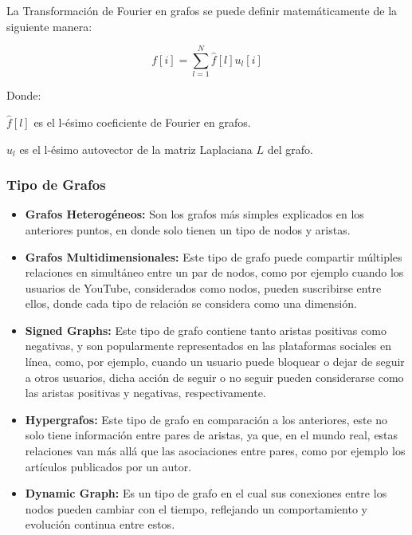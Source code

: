 La Transformación de Fourier en grafos se puede definir matemáticamente de la siguiente manera: 


\begin{equation}
	f[i] = \sum_{l=1}^{N}\hat{f}[l]u_{l}[i]
\end{equation}

Donde: 

$\hat{f}[l]$ es el l-ésimo coeficiente de Fourier en grafos.

$u_{l}$ es el l-ésimo autovector de la matriz Laplaciana $L$ del grafo.

\subsubsection{Tipo de Grafos \parencite{bk_grafo}}

\begin{itemize}
	\item \textbf{Grafos Heterogéneos:} Son los grafos más simples explicados en los anteriores puntos, en donde solo tienen un tipo de nodos y aristas.
	
	\item \textbf{Grafos Multidimensionales:} Este tipo de grafo puede compartir múltiples relaciones en simultáneo entre un par de nodos, como por ejemplo cuando los usuarios de YouTube, considerados como nodos, pueden suscribirse entre ellos, donde cada tipo de relación se considera como una dimensión.
	
	\item \textbf{Signed Graphs:} Este tipo de grafo contiene tanto aristas positivas como negativas, y son popularmente representados en las plataformas sociales en línea, como, por ejemplo, cuando un usuario puede bloquear o dejar de seguir a otros usuarios, dicha acción de seguir o no seguir pueden considerarse como las aristas positivas y negativas, respectivamente.
	
	\item \textbf{Hypergrafos:} Este tipo de grafo en comparación a los anteriores, este no solo tiene información entre pares de aristas, ya que, en el mundo real, estas relaciones van más allá que las asociaciones entre pares, como por ejemplo los artículos publicados por un autor.
	
	\item \textbf{Dynamic Graph:} Es un tipo de grafo en el cual sus conexiones entre los nodos pueden cambiar con el tiempo, reflejando un comportamiento y evolución continua entre estos.
	
\end{itemize}


